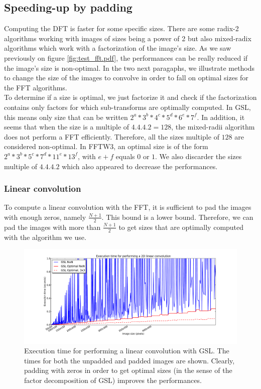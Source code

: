 \documentclass[a4paper,10pt,twoside]{article}
\begin{document}
\subsection{Speeding-up by padding}

Computing the DFT is faster for some specific sizes. There are some radix-2 algorithms working with images of sizes being a power of 2 but also mixed-radix algorithms which work with a factorization of the image's size. As we saw previously on figure \ref{fig:test_fft.pdf}, the performances can be really reduced if the image's size is non-optimal. In the two next paragaphs, we illustrate methods to change the size of the images to convolve in order to fall on optimal sizes for the FFT algorithms.\\

To determine if a size is optimal, we just factorize it and check if the factorization contains only factors for which sub-transforms are optimally computed. In GSL, this means only size that can be written $2^a*3^b*4^c*5^d*6^e*7^f$. In addition, it seems that when the size is a multiple of $4.4.4.2 = 128$, the mixed-radii algorithm does not perform a FFT efficiently. Therefore, all the sizes multiple of $128$ are considered non-optimal. In FFTW3, an optimal size is of the form $2^a*3^b*5^c*7^d*11^e*13^f$, with $e+f$ equals $0$ or $1$. We also discarder the sizes multiple of $4.4.4.2$ which also appeared to decrease the performances.\\

\subsubsection{Linear convolution}

To compute a linear convolution with the FFT, it is sufficient to pad the images with enough zeros, namely $\frac{N+1}{2}$. This bound is a lower bound. Therefore, we can pad the images with more than $\frac{N+1}{2}$ to get sizes that are optimally computed with the algorithm we use.\\

\begin{figure}[htbp]
\center \includegraphics[width=0.75\linewidth]{Images/benchmark_linear_convolution_gsl.pdf}
\caption{\label{fig:benchmark_linear_convolution_gsl.pdf}Execution time for performing a linear convolution with GSL. The times for both the unpadded and padded images are shown. Clearly, padding with zeros in order to get optimal sizes (in the sense of the factor decomposition of GSL) improves the performances.}
\end{figure}
\end{document}
